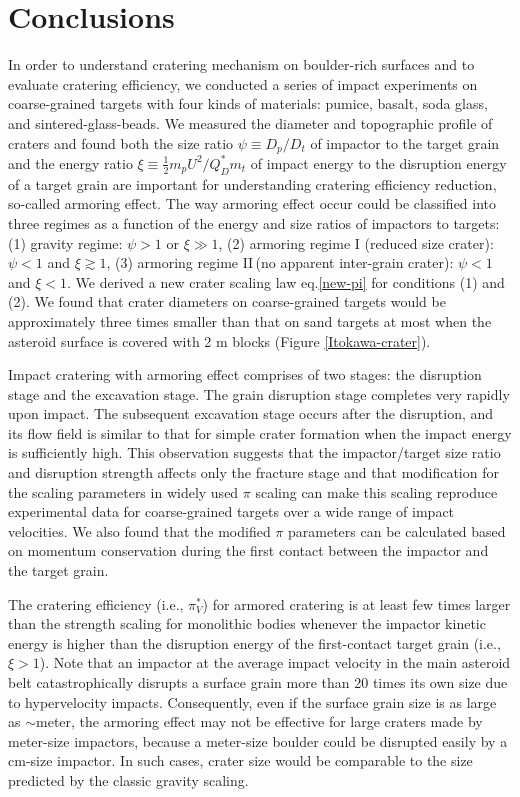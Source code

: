 \documentclass[3p,authoryear]{elsarticle}
\newcommand{\II}{I\hspace{-.1 em}I}
\begin{document}
 \section{Conclusions}\label{sec:conclusion}
In order to understand cratering mechanism on boulder-rich surfaces and to evaluate cratering efficiency, we conducted a series of impact experiments on coarse-grained targets with four kinds of materials: pumice, basalt, soda glass, and sintered-glass-beads.
We measured the diameter and topographic profile of craters and found both the size ratio $\psi\equiv D_p/D_t$ of impactor to the target grain and the energy ratio $\xi\equiv \frac{1}{2}m_pU^2/Q_D^*m_t$ of impact energy to the disruption energy of a target grain are important for understanding cratering efficiency reduction, so-called armoring effect.
The way armoring effect occur could be classified into three regimes as a function of the energy and size ratios of impactors to targets: (1) gravity regime: $\psi>1$ or $\xi\gg 1$, (2) armoring regime I (reduced size crater): $\psi<1$ and $\xi\gtrsim 1$, (3) armoring regime \II\,(no apparent inter-grain crater): $\psi<1$ and $\xi<1$.
We derived a new crater scaling law eq.\eqref{new-pi} for conditions (1) and (2).
We found that crater diameters on coarse-grained targets would be approximately three times smaller than that on sand targets at most when the asteroid surface is covered with 2 m blocks (Figure \ref{Itokawa-crater}).

Impact cratering with armoring effect comprises of two stages: the disruption stage and the excavation stage.
The grain disruption stage completes very rapidly upon impact.
The subsequent excavation stage occurs after the disruption, and its flow field is similar to that for simple crater formation when the impact energy is sufficiently high.
This observation suggests that the impactor/target size ratio and disruption strength affects only the fracture stage and that modification for the scaling parameters in widely used $\pi$ scaling \citep[e.g.,][]{holsapple1993} can make this scaling reproduce experimental data for coarse-grained targets over a wide range of impact velocities.
We also found that the modified $\pi$ parameters can be calculated based on momentum conservation during the first contact between the impactor and the target grain.

The cratering efficiency (i.e., $\pi_V^*$) for armored cratering is at least few times larger than the strength scaling for monolithic bodies whenever the impactor kinetic energy is higher than the disruption energy of the first-contact target grain (i.e., $\xi>1$). Note that an impactor at the average impact velocity in the main asteroid belt catastrophically disrupts a surface grain more than 20 times its own size due to hypervelocity impacts. Consequently, even if the surface grain size is as large as $\sim$meter, the armoring effect may not be effective for large craters made by meter-size impactors, because a meter-size boulder could be disrupted easily by a cm-size impactor. In such cases, crater size would be comparable to the size predicted by the classic gravity scaling.
\end{document}
